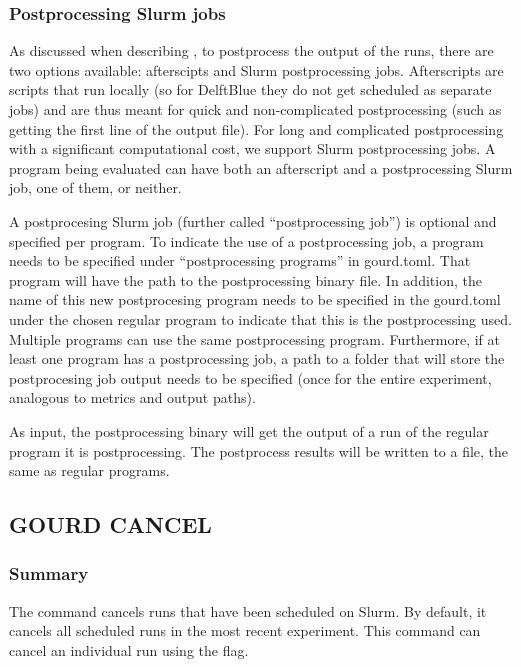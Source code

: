 \documentclass[a4paper,english]{article}
\begin{document}
\begin{adjustwidth}{18pt}{0pt}
            \subsubsection{Postprocessing Slurm jobs}
                As discussed when describing  , to postprocess the output of the runs,
                there are two options available: afterscipts and Slurm postprocessing jobs. Afterscripts are
                scripts that run locally (so for DelftBlue they do not get scheduled as separate jobs) and are
                thus meant for quick and non-complicated postprocessing (such as getting the first line of the
                output file). For long and complicated postprocessing with a significant computational cost,
                we support Slurm postprocessing jobs. A program being evaluated can have both an afterscript
                and a postprocessing Slurm job, one of them, or neither.

                A postprocesing Slurm job (further called ``postprocessing job'') is optional and specified per
                program. To indicate the use of a postprocessing job, a program needs to be specified under
                ``postprocessing programs'' in gourd.toml. That program will have the path to the postprocessing
                binary file. In addition, the name of this new postprocesing program needs to be specified in
                the gourd.toml under the chosen regular program to indicate that this is the postprocessing
                used. Multiple programs can use the same postprocessing program. Furthermore, if at least one
                program has a postprocessing job, a path to a folder that will store the postprocesing job
                output needs to be specified (once for the entire experiment, analogous to metrics and output
                paths).

                As input, the postprocessing binary will get the output of a run of the regular program it is
                postprocessing. The postprocess results will be written to a file, the same as regular programs.

        \subsection{GOURD CANCEL}

            \subsubsection{Summary}
                The   command cancels runs that have been scheduled on Slurm.
                By default, it cancels all scheduled runs in the most recent experiment.
                This command can cancel an individual run using the  flag.


\end{adjustwidth}
\end{document}
